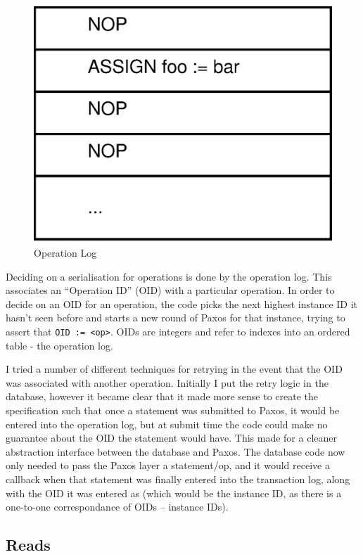 \documentclass[12pt,twoside,notitlepage]{report}
\begin{document}
\begin{figure}[htb]
\centering
\includegraphics[scale=0.5]{figs/op-log.eps}
\caption{\label{fig:op-log}Operation Log}
\end{figure}

Deciding on a serialisation for operations is done by the operation log. This associates an
``Operation ID'' (OID) with a particular operation. In order to decide on an OID for an operation,
the code picks the next highest instance ID it hasn't seen before and starts a new round of Paxos
for that instance, trying to assert that \verb$OID := <op>$. OIDs are integers and refer to
indexes into an ordered table - the operation log.

I tried a number of different techniques for retrying in the event that the OID was associated
with another operation. Initially I put the retry logic in the database, however it became clear
that it made more sense to create the specification such that once a statement was submitted to
Paxos, it would be entered into the operation log, but at submit time the code could make no
guarantee about the OID the statement would have. This made for a cleaner abstraction interface
between the database and Paxos. The database code now only needed to pass the Paxos layer a
statement/op, and it would receive a callback when that statement was finally entered into the
transaction log, along with the OID it was entered as (which would be the instance ID, as there is
a one-to-one correspondance of OIDs -- instance IDs).

\subsection{Reads}
\end{document}
